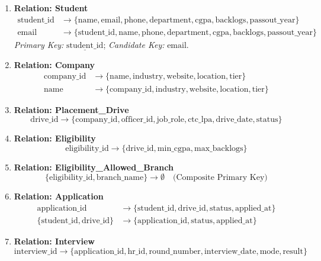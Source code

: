 \documentclass[11pt,a4paper]{article}
\begin{document}
\begin{enumerate}[label=\textbf{\arabic*.}]
    \item \textbf{Relation: Student}
    \[
    \begin{aligned}
        \text{student\_id} &\to \{\text{name}, \text{email}, \text{phone}, \text{department}, \text{cgpa}, \text{backlogs}, \text{passout\_year}\} \\
        \text{email} &\to \{\text{student\_id}, \text{name}, \text{phone}, \text{department}, \text{cgpa}, \text{backlogs}, \text{passout\_year}\}
    \end{aligned}
    \]
    \textit{Primary Key:} $\underline{\text{student\_id}}$; \textit{Candidate Key:} $\text{email}$.
    
    \item \textbf{Relation: Company}
    \[
    \begin{aligned}
        \text{company\_id} &\to \{\text{name}, \text{industry}, \text{website}, \text{location}, \text{tier}\} \\
        \text{name} &\to \{\text{company\_id}, \text{industry}, \text{website}, \text{location}, \text{tier}\}
    \end{aligned}
    \]
    
    \item \textbf{Relation: Placement\_Drive}
    \[
    \text{drive\_id} \to \{\text{company\_id}, \text{officer\_id}, \text{job\_role}, \text{ctc\_lpa}, \text{drive\_date}, \text{status}\}
    \]
    
    \item \textbf{Relation: Eligibility}
    \[
    \text{eligibility\_id} \to \{\text{drive\_id}, \text{min\_cgpa}, \text{max\_backlogs}\}
    \]
    
    \item \textbf{Relation: Eligibility\_Allowed\_Branch}
    \[
    \{\text{eligibility\_id}, \text{branch\_name}\} \to \emptyset \quad \text{(Composite Primary Key)}
    \]
    
    \item \textbf{Relation: Application}
    \[
    \begin{aligned}
        \text{application\_id} &\to \{\text{student\_id}, \text{drive\_id}, \text{status}, \text{applied\_at}\} \\
        \{\text{student\_id}, \text{drive\_id}\} &\to \{\text{application\_id}, \text{status}, \text{applied\_at}\}
    \end{aligned}
    \]
    
    \item \textbf{Relation: Interview}
    \[
    \text{interview\_id} \to \{\text{application\_id}, \text{hr\_id}, \text{round\_number}, \text{interview\_date}, \text{mode}, \text{result}\}
    \]
    

\end{enumerate}
\end{document}

